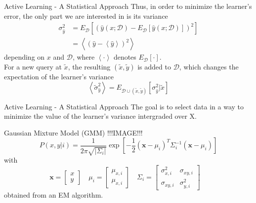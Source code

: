 \documentclass{beamer}
\newcommand{\D}{\mathcal{D}}
\newcommand{\ly}{\hat{y}(x;\D)}
\newcommand{\xt}{\tilde{x}}
\newcommand{\yt}{\tilde{y}}
\newcommand{\st}{\tilde{\sigma}}
\newcommand{\E}[1]{\left< #1 \right>}
\begin{document}
\begin{frame}{Active Learning - A Statistical Approach}
Thus, in order to minimize the learner's error, the only part we are interested
in is its variance
\begin{equation}\begin{split}
  \sigma_{\hat{y}}^2
  & = E_{\D} \left[\left(\ly - E_{\D} \left[\ly\right]\right)^2 \right] \\
  & = \left<(\hat{y} - \left<\hat{y}\right> )^2\right>
\end{split}\end{equation}
depending on $x$ and $\D$, where $\left< \cdot \right>$ denotes
$E_\D\left[\cdot\right]$.\\

For a new query at $\xt$, the resulting $(\xt,\yt)$ is added to $\D$, which
changes the expectation of the learner's variance
\begin{equation}
  \E{\st_{\hat{y}}^2} = E_{\D\cup(\xt,\yt)} \left[\sigma_{\hat{y}}^2 | \xt \right]
\end{equation}
\end{frame}

\begin{frame}{Active Learning - A Statistical Approach}
The goal is to select data in a way to minimize the value of the
learner's variance intergraded over X.
\end{frame}


\begin{frame}{Gaussian Mixture Model (GMM)}
!!!IMAGE!!!
\begin{equation}
P(x,y|i) = \frac{1}{2\pi\sqrt{|\Sigma_i|}} \exp
\left[ -\frac{1}{2}(\mathbf{x}-\mu_i)^T\Sigma_i^{-1}(\mathbf{x}-\mu_i) \right]
\end{equation}
with
\[
\mathbf{x} = \left[ \begin{array}{c} x \\ y \end{array} \right] \quad
\mu_i = \left[ \begin{array}{c} \mu_{x,i} \\ \mu_{x,i} \end{array} \right] \quad
\Sigma_i = \left[ \begin{array}{cc} \sigma^2_{x,i} & \sigma_{xy,i} \\
    \sigma_{xy,i} & \sigma^2_{y,i} \end{array} \right] \quad
\]
obtained from an EM algorithm.
\end{frame}
\end{document}
